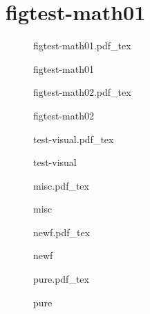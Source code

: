 \documentclass{article}
\newcommand{\incfig}[2][1]{%
	\def\svgwidth{#1\columnwidth}
	{#2.pdf_tex}
}
\begin{document}
\section{ figtest-math01}

\begin{figure}[ht]
	\centering
	\incfig{figtest-math01}
	\caption{figtest-math01}
	\label{fig:figtest-math01}
\end{figure}

\begin{figure}[ht]
	\centering
	\incfig{figtest-math02}
	\caption{figtest-math02}
	\label{fig:figtest-math02}
\end{figure}

\begin{figure}[ht]
	\centering
	\incfig{test-visual}
	\caption{test-visual}
	\label{fig:test-visual}
\end{figure}

\begin{figure}[htpb]
	\centering
	\incfig{misc}
	\caption{misc}
	\label{fig:misc}
\end{figure}

\begin{figure}[ht]
	\centering
	\incfig{newf}
	\caption{newf}
	\label{fig:newf}
\end{figure}

\begin{figure}[ht]
    \centering
    \incfig{pure}
    \caption{pure}
    \label{fig:pure}
\end{figure}
\end{document}
